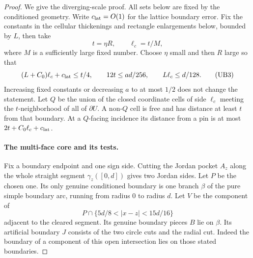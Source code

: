 \begin{proof}
We give the diverging-scale proof.  All sets below are fixed by the
conditioned geometry.  Write \(c_{\rm lat}=O(1)\) for the lattice
boundary error.  Fix the constants in the cellular thickenings and
rectangle enlargements below, bounded by \(L\), then take
\[
 t=\eta R,\qquad \ell_c=t/M,
\]
where \(M\) is a sufficiently large fixed number.  Choose \(\eta\)
small and then \(R\) large so that
\[
 (L+C_0)\ell_c+c_{\rm lat}\le t/4,\qquad
 12t\le ad/256,\qquad L\ell_c\le d/128.                               \tag{UB3}
\]
Increasing fixed constants or decreasing \(a\) to at most \(1/2\)
does not change the statement.  Let \(Q\) be the union of the closed
coordinate cells of side \(\ell_c\) meeting the \(t\)-neighborhood of
all of \(\partial U\).  A non-\(Q\) cell is free and has distance
at least \(t\) from that boundary.  At a \(Q\)-facing incidence its
distance from a pin is at most \(2t+C_0\ell_c+c_{\rm lat}\).

\paragraph{The multi-face core and its tests.}
Fix a boundary endpoint and one sign side.  Cutting the Jordan pocket
\(A_z\) along the whole straight segment \(\gamma_z([0,d])\) gives
two Jordan sides.  Let \(P\) be the chosen one.  Its only genuine
conditioned boundary is one branch \(\beta\) of the pure simple
boundary arc, running from radius \(0\) to radius \(d\).
Let \(V\) be the component of
\[
              P\cap\{5d/8<|x-z|<15d/16\}
\]
adjacent to the cleared segment.  Its genuine boundary pieces \(B\)
lie on \(\beta\).  Its artificial boundary \(J\) consists of the
two circle cuts and the radial cut.  Indeed the boundary of a
component of this open intersection lies on those stated boundaries.


\end{proof}
